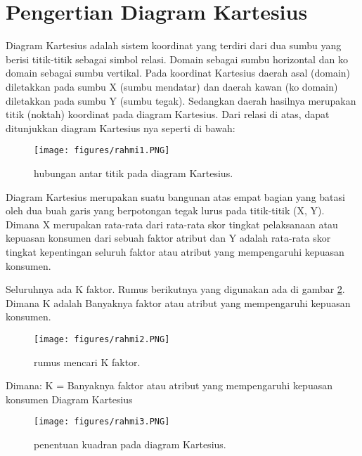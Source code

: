 
\section{Pengertian Diagram Kartesius}

Diagram Kartesius adalah sistem koordinat yang terdiri dari dua sumbu yang berisi titik-titik sebagai simbol relasi.
Domain sebagai sumbu horizontal dan ko domain sebagai sumbu vertikal.
Pada koordinat Kartesius daerah asal (domain) diletakkan pada sumbu X (sumbu mendatar) dan daerah kawan (ko domain) diletakkan pada sumbu Y (sumbu tegak).
Sedangkan daerah hasilnya merupakan titik (noktah) koordinat pada diagram Kartesius. Dari relasi di atas, dapat ditunjukkan diagram Kartesius nya seperti di bawah:

\begin{figure}[ht]
	\centerline{\texttt{[image: figures/rahmi1.PNG]}}
	\caption{hubungan antar titik pada diagram Kartesius.}
	\label{rahmi1}
	\end{figure}

Diagram Kartesius merupakan suatu bangunan atas empat bagian yang batasi oleh dua buah garis yang berpotongan tegak lurus pada titik-titik (X, Y). 
Dimana X merupakan rata-rata dari rata-rata skor tingkat pelaksanaan atau kepuasan konsumen dari sebuah faktor atribut 
dan Y adalah rata-rata skor tingkat kepentingan seluruh faktor atau atribut yang mempengaruhi kepuasan konsumen.

Seluruhnya ada K faktor. Rumus berikutnya yang digunakan ada di gambar \ref{rahmi2}. Dimana K adalah Banyaknya faktor atau atribut yang mempengaruhi kepuasan konsumen.

\begin{figure}[ht]
	\centerline{\texttt{[image: figures/rahmi2.PNG]}}
	\caption{rumus mencari K faktor.}
	\label{rahmi2}
	\end{figure}


Dimana: K = Banyaknya faktor atau atribut yang mempengaruhi kepuasan konsumen 
Diagram Kartesius	

\begin{figure}[ht]
	\centerline{\texttt{[image: figures/rahmi3.PNG]}}
	\caption{penentuan kuadran pada diagram Kartesius.}
	\label{rahmi3}
\end{figure}


